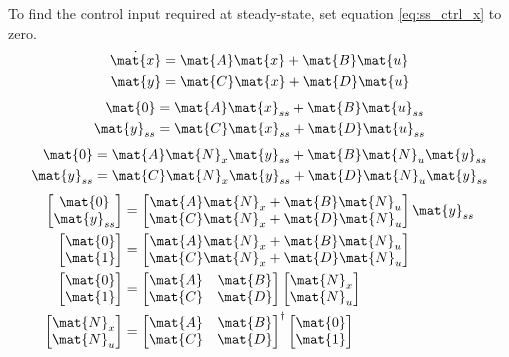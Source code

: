 To find the \gls{control input} required at steady-state, set equation
\eqref{eq:ss_ctrl_x} to zero.
\begin{align*}
  \dot{\mat{x}} &= \mat{A}\mat{x} + \mat{B}\mat{u} \\
  \mat{y} &= \mat{C}\mat{x} + \mat{D}\mat{u}
\end{align*}
\begin{align*}
  \mat{0} &= \mat{A}\mat{x}_{ss} + \mat{B}\mat{u}_{ss} \\
  \mat{y}_{ss} &= \mat{C}\mat{x}_{ss} + \mat{D}\mat{u}_{ss}
\end{align*}
\begin{align*}
  \mat{0} &= \mat{A}\mat{N}_x\mat{y}_{ss} + \mat{B}\mat{N}_u\mat{y}_{ss} \\
  \mat{y}_{ss} &= \mat{C}\mat{N}_x\mat{y}_{ss} + \mat{D}\mat{N}_u\mat{y}_{ss}
\end{align*}
\begin{align*}
  \begin{bmatrix}
    \mat{0} \\
    \mat{y}_{ss}
  \end{bmatrix} &=
  \begin{bmatrix}
    \mat{A}\mat{N}_x + \mat{B}\mat{N}_u \\
    \mat{C}\mat{N}_x + \mat{D}\mat{N}_u
  \end{bmatrix}
  \mat{y}_{ss} \\
  \begin{bmatrix}
    \mat{0} \\
    \mat{1}
  \end{bmatrix} &=
  \begin{bmatrix}
    \mat{A}\mat{N}_x + \mat{B}\mat{N}_u \\
    \mat{C}\mat{N}_x + \mat{D}\mat{N}_u
  \end{bmatrix} \\
  \begin{bmatrix}
    \mat{0} \\
    \mat{1}
  \end{bmatrix} &=
  \begin{bmatrix}
    \mat{A} & \mat{B} \\
    \mat{C} & \mat{D}
  \end{bmatrix}
  \begin{bmatrix}
    \mat{N}_x \\
    \mat{N}_u
  \end{bmatrix} \\
  \begin{bmatrix}
    \mat{N}_x \\
    \mat{N}_u
  \end{bmatrix} &=
  \begin{bmatrix}
    \mat{A} & \mat{B} \\
    \mat{C} & \mat{D}
  \end{bmatrix}^{\dagger}
  \begin{bmatrix}
    \mat{0} \\
    \mat{1}
  \end{bmatrix}
\end{align*}

